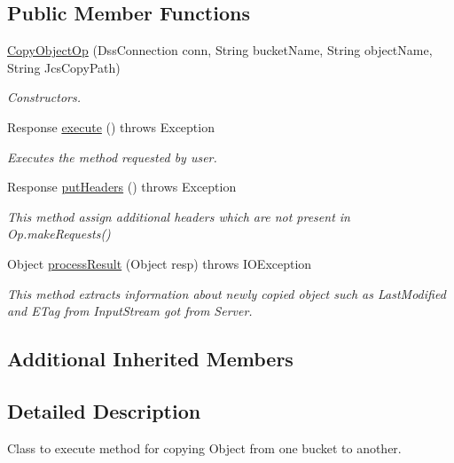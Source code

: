 \subsection*{Public Member Functions}
\begin{DoxyCompactItemize}
\item 
\hyperlink{classorg_1_1jcs_1_1dss_1_1op_1_1CopyObjectOp_a1c6f7605c588295606ee7b073571f688}{Copy\+Object\+Op} (Dss\+Connection conn, String bucket\+Name, String object\+Name, String Jcs\+Copy\+Path)\hypertarget{classorg_1_1jcs_1_1dss_1_1op_1_1CopyObjectOp_a1c6f7605c588295606ee7b073571f688}{}\label{classorg_1_1jcs_1_1dss_1_1op_1_1CopyObjectOp_a1c6f7605c588295606ee7b073571f688}

\begin{DoxyCompactList}\small\item\em Constructors. \end{DoxyCompactList}\item 
Response \hyperlink{classorg_1_1jcs_1_1dss_1_1op_1_1CopyObjectOp_a025ad8a7df5e040398bba72d1ee50438}{execute} ()  throws Exception 
\begin{DoxyCompactList}\small\item\em Executes the method requested by user. \end{DoxyCompactList}\item 
Response \hyperlink{classorg_1_1jcs_1_1dss_1_1op_1_1CopyObjectOp_ad9ac1d7eaf2ab0be9893b273e955b8e4}{put\+Headers} ()  throws Exception 
\begin{DoxyCompactList}\small\item\em This method assign additional headers which are not present in Op.\+make\+Requests() \end{DoxyCompactList}\item 
Object \hyperlink{classorg_1_1jcs_1_1dss_1_1op_1_1CopyObjectOp_adceba3616fa9df2c95f22c8979295b78}{process\+Result} (Object resp)  throws I\+O\+Exception
\begin{DoxyCompactList}\small\item\em This method extracts information about newly copied object such as Last\+Modified and E\+Tag from Input\+Stream got from Server. \end{DoxyCompactList}\end{DoxyCompactItemize}
\subsection*{Additional Inherited Members}


\subsection{Detailed Description}
Class to execute method for copying Object from one bucket to another. 

